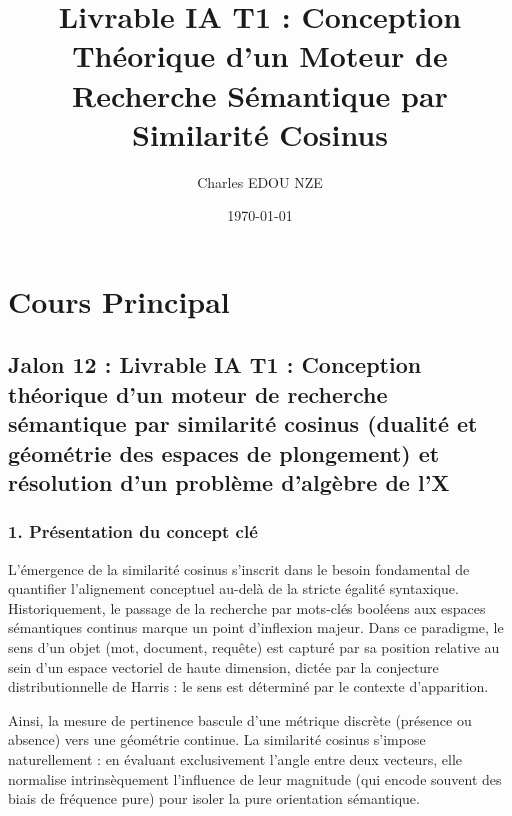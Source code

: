 \documentclass[11pt,a4paper]{report}
\title{Livrable IA T1 : Conception Théorique d'un Moteur de Recherche Sémantique par Similarité Cosinus}
\author{Charles EDOU NZE}
\date{\today}
\begin{document}
\maketitle
\tableofcontents

\chapter{Cours Principal}
\hypertarget{jalon-12-livrable-ia-t1-conception-thuxe9orique-dun-moteur-de-recherche-suxe9mantique-par-similarituxe9-cosinus-dualituxe9-et-guxe9omuxe9trie-des-espaces-de-plongement-et-ruxe9solution-dun-probluxe8me-dalguxe8bre-de-lx}{%
\section{Jalon 12 : Livrable IA T1 : Conception théorique d'un moteur de
recherche sémantique par similarité cosinus (dualité et géométrie des
espaces de plongement) et résolution d'un problème d'algèbre de
l'X}\label{jalon-12-livrable-ia-t1-conception-thuxe9orique-dun-moteur-de-recherche-suxe9mantique-par-similarituxe9-cosinus-dualituxe9-et-guxe9omuxe9trie-des-espaces-de-plongement-et-ruxe9solution-dun-probluxe8me-dalguxe8bre-de-lx}}

\hypertarget{pruxe9sentation-du-concept-cluxe9}{%
\subsection{1. Présentation du concept
clé}\label{pruxe9sentation-du-concept-cluxe9}}

L'émergence de la similarité cosinus s'inscrit dans le besoin
fondamental de quantifier l'alignement conceptuel au-delà de la stricte
égalité syntaxique. Historiquement, le passage de la recherche par
mots-clés booléens aux espaces sémantiques continus marque un point
d'inflexion majeur. Dans ce paradigme, le sens d'un objet (mot,
document, requête) est capturé par sa position relative au sein d'un
espace vectoriel de haute dimension, dictée par la conjecture
distributionnelle de Harris : le sens est déterminé par le contexte
d'apparition.

Ainsi, la mesure de pertinence bascule d'une métrique discrète (présence
ou absence) vers une géométrie continue. La similarité cosinus s'impose
naturellement : en évaluant exclusivement l'angle entre deux vecteurs,
elle normalise intrinsèquement l'influence de leur magnitude (qui encode
souvent des biais de fréquence pure) pour isoler la pure orientation
sémantique.
\end{document}
